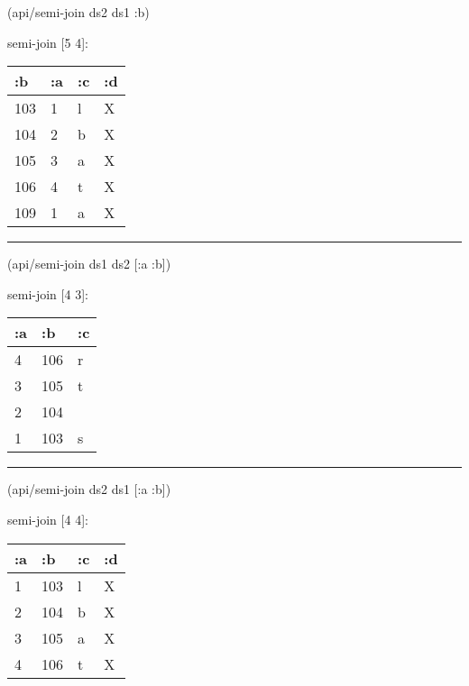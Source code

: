 \documentclass[]{article}
\newenvironment{Shaded}{\begin{snugshade}}{\end{snugshade}}
\newcommand{\AttributeTok}[1]{\textcolor[rgb]{0.77,0.63,0.00}{#1}}
\newcommand{\NormalTok}[1]{#1}
\begin{document}
\begin{Shaded}
\begin{Highlighting}[]
\NormalTok{(api/semi-join ds2 ds1 }\AttributeTok{:b}\NormalTok{)}
\end{Highlighting}
\end{Shaded}

semi-join {[}5 4{]}:

\begin{longtable}[]{@{}llll@{}}
\toprule
:b & :a & :c & :d\tabularnewline
\midrule
\endhead
103 & 1 & l & X\tabularnewline
104 & 2 & b & X\tabularnewline
105 & 3 & a & X\tabularnewline
106 & 4 & t & X\tabularnewline
109 & 1 & a & X\tabularnewline
\bottomrule
\end{longtable}

\begin{center}\rule{0.5\linewidth}{0.5pt}\end{center}

\begin{Shaded}
\begin{Highlighting}[]
\NormalTok{(api/semi-join ds1 ds2 [}\AttributeTok{:a} \AttributeTok{:b}\NormalTok{])}
\end{Highlighting}
\end{Shaded}

semi-join {[}4 3{]}:

\begin{longtable}[]{@{}lll@{}}
\toprule
:a & :b & :c\tabularnewline
\midrule
\endhead
4 & 106 & r\tabularnewline
3 & 105 & t\tabularnewline
2 & 104 &\tabularnewline
1 & 103 & s\tabularnewline
\bottomrule
\end{longtable}

\begin{center}\rule{0.5\linewidth}{0.5pt}\end{center}

\begin{Shaded}
\begin{Highlighting}[]
\NormalTok{(api/semi-join ds2 ds1 [}\AttributeTok{:a} \AttributeTok{:b}\NormalTok{])}
\end{Highlighting}
\end{Shaded}

semi-join {[}4 4{]}:

\begin{longtable}[]{@{}llll@{}}
\toprule
:a & :b & :c & :d\tabularnewline
\midrule
\endhead
1 & 103 & l & X\tabularnewline
2 & 104 & b & X\tabularnewline
3 & 105 & a & X\tabularnewline
4 & 106 & t & X\tabularnewline
\bottomrule
\end{longtable}
\end{document}
